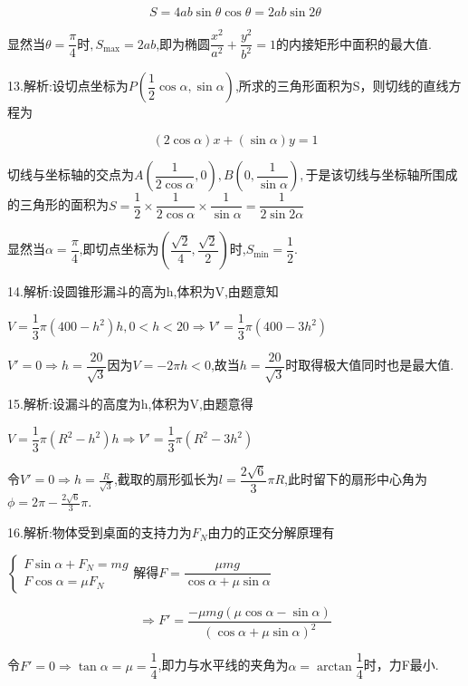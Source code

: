 $$S = 4ab\sin \theta \cos \theta  = 2ab\sin 2\theta $$

显然当$\theta  = \dfrac{\pi }{4}$时$,{S_{\max }} = 2ab$,即为椭圆$\dfrac{{{x^2}}}{{{a^2}}} + \dfrac{{{y^2}}}{{{b^2}}} = 1$的内接矩形中面积的最大值.

13.解析:设切点坐标为$P\left( {\dfrac{1}{2}\cos \alpha ,\sin \alpha } \right)$,所求的三角形面积为S，则切线的直线方程为

$$\left( {2\cos \alpha } \right)x + \left( {\sin \alpha } \right)y = 1$$

切线与坐标轴的交点为$A\left( {\dfrac{1}{{2\cos \alpha }},0} \right),B\left( {0,\dfrac{1}{{\sin \alpha }}} \right),$于是该切线与坐标轴所围成的三角形的面积为$S = \dfrac{1}{2} \times \dfrac{1}{{2\cos \alpha }} \times \dfrac{1}{{\sin \alpha }} = \dfrac{1}{{2\sin 2\alpha }}$

显然当$\alpha  = \dfrac{\pi }{4}$,即切点坐标为$\left( {\dfrac{{\sqrt 2 }}{4},\dfrac{{\sqrt 2 }}{2}} \right)$时,${S_{\min }} = \dfrac{1}{2}$.

14.解析:设圆锥形漏斗的高为h,体积为V,由题意知

$V = \dfrac{1}{3}\pi \left( {400 - {h^2}} \right)h,0 < h < 20$$ \Rightarrow V' = \dfrac{1}{3}\pi \left( {400 - 3{h^2}} \right)$

$V' = 0 \Rightarrow h = \dfrac{20}{{\sqrt 3 }}$因为$V =  - 2\pi h < 0$,故当$h = \dfrac{20}{{\sqrt 3 }}$时取得极大值同时也是最大值.

15.解析:设漏斗的高度为h,体积为V,由题意得

$V = \dfrac{1}{3}\pi \left( {{R^2} - {h^2}} \right)h \Rightarrow V' = \dfrac{1}{3}\pi \left( {{R^2} - 3{h^2}} \right)$

令$V' = 0 \Rightarrow h = \frac{R}{{\sqrt 3 }}$,截取的扇形弧长为$l = \dfrac{{2\sqrt 6 }}{3}\pi R$,此时留下的扇形中心角为$\phi  = 2\pi  - \frac{{2\sqrt 6 }}{3}\pi .$

16.解析:物体受到桌面的支持力为${F_N}$由力的正交分解原理有

$\left\{ {\begin{array}{*{20}{c}}
{F\sin \alpha  + {F_N} = mg}\\
{F\cos \alpha  = \mu {F_N}}
\end{array}} \right.$解得$F = \dfrac{{\mu mg}}{{\cos \alpha  + \mu \sin \alpha }}$

$$ \Rightarrow F' = \dfrac{{ - \mu mg\left( {\mu \cos \alpha  - \sin \alpha } \right)}}{{{{\left( {\cos \alpha  + \mu \sin \alpha } \right)}^2}}}$$

令$F' = 0 \Rightarrow \tan \alpha  = \mu  = \dfrac{1}{4}$,即力与水平线的夹角为$\alpha  = \arctan \dfrac{1}{4}$时，力F最小.

